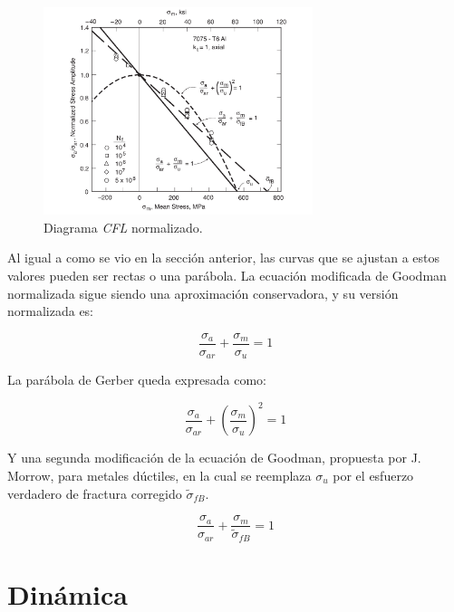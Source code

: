 \begin{figure}[h]
\centering
\includegraphics[width=0.7\textwidth]{Imagenes/cfl_norm.pdf}
\caption{Diagrama \textit{CFL} normalizado. \cite{dowling2013mechanical}}
\label{fig:cfl_norm}
\end{figure}

Al igual a como se vio en la sección anterior, las curvas que se ajustan a estos valores pueden ser rectas o una parábola. La ecuación modificada de Goodman normalizada sigue siendo una aproximación conservadora, y su versión normalizada es:

\begin{equation} \label{eq:good_norm}
	\frac{\sigma_a}{\sigma_{ar}} + \frac{\sigma_m}{\sigma_u} = 1 
\end{equation}

La parábola de Gerber queda expresada como:

\begin{equation} \label{eq:par_gerber}
	\frac{\sigma_a}{\sigma_{ar}} + \left(\frac{\sigma_m}{\sigma_u}\right)^2 = 1 
\end{equation}

Y una segunda modificación de la ecuación de Goodman, propuesta por J. Morrow, para metales dúctiles, en la cual se reemplaza $\sigma_u$ por el esfuerzo verdadero de fractura corregido $\tilde{\sigma}_{fB}$.

\begin{equation} \label{eq:mod_goodduct}
	\frac{\sigma_a}{\sigma_{ar}} + \frac{\sigma_m}{\tilde{\sigma}_{fB}} = 1 
\end{equation}

\newpage

\section{Dinámica}

